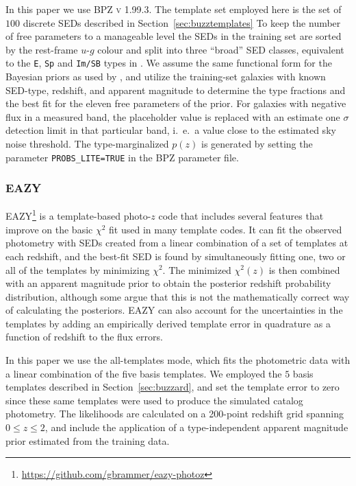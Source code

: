 \documentclass[usenatbib]{mn2e}
\newcommand{\red}[1]{\textcolor{red}{#1}}
\begin{document}
In this paper we use \textsc{BPZ v 1.99.3}. The template set employed here is the set of $100$ discrete SEDs described in Section~\ref{sec:buzztemplates}
To keep the number of free parameters to a manageable level the SEDs in the training set are sorted by the rest-frame $u$-$g$ colour and split into three ``broad'' SED classes, equivalent to the \texttt{E}, \texttt{Sp} and \texttt{Im/SB} types in \citet{Benitez:00}. We assume the same functional form for the Bayesian priors as used by \citet{Benitez:00}, and utilize the training-set galaxies with known SED-type, redshift, and apparent magnitude to determine the type fractions and the best fit for the eleven free parameters of the prior. 
For galaxies with negative flux in a measured band, the placeholder value is replaced with an estimate one $\sigma$ detection limit in that particular band, i.~e.~a value close to the estimated sky noise threshold. 
The type-marginalized $p(z)$ is generated by setting the parameter \texttt{PROBS\_LITE=TRUE} in the \textsc{BPZ} parameter file.

\subsubsection{EAZY} \label{sec:eazy}

\textsc{EAZY}\footnote{\url{https://github.com/gbrammer/eazy-photoz}} \citep[Easy and Accurate Photometric Redshifts from Yale,][]{Brammer:08} is a template-based photo-$z$ code that includes several features that improve on the basic $\chi^2$ fit used in many template codes. It can fit the observed photometry with SEDs created from a linear combination of a set of templates at each redshift, and the best-fit SED is found by simultaneously fitting one, two or all of the templates by minimizing $\chi^2$. The minimized $\chi^2(z)$ is then combined with an apparent magnitude prior to obtain the posterior redshift probability distribution, although some argue that this is not the mathematically correct way of calculating the posteriors. \textsc{EAZY} can also account for the uncertainties in the templates by adding an empirically derived template error in quadrature as a function of redshift to the flux errors. 

In this paper we use the all-templates mode, which fits the photometric data with a linear combination of the five basis templates. We employed the $5$ basis templates described in Section~\ref{sec:buzzard}, and set the template error to zero since these same templates were used to produce the simulated catalog photometry. %
The likelihoods are calculated on a 200-point redshift grid spanning $0\leq z \leq 2$, and include the application of a type-independent apparent magnitude prior estimated from the training data.
\end{document}
